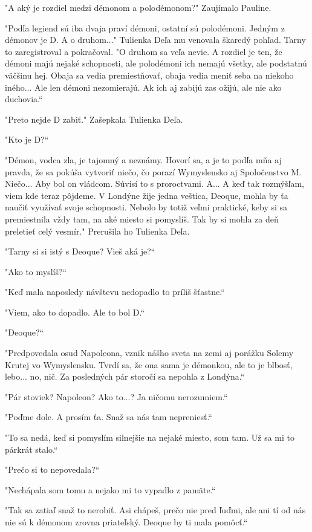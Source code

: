\documentclass{book}
\begin{document}
"$ $A aký je rozdiel medzi démonom a polodémonom?"$ $ Zaujímalo Pauline.

"Podľa legiend sú iba dvaja praví démoni, ostatní sú polodémoni. Jedným z démonov je D. A o druhom..."$ $ Tulienka Deľa mu venovala škaredý pohľad. Tarny to zaregistroval a pokračoval. "$ $O druhom sa veľa nevie. A rozdiel je ten, že démoni majú nejaké schopnosti, ale polodémoni ich nemajú všetky, ale podstatnú väčšinu hej. Obaja sa vedia premiestňovať, obaja vedia meniť seba na niekoho iného... Ale len démoni nezomierajú. Ak ich aj zabijú zas ožijú, ale nie ako duchovia.“

"Preto nejde D zabiť."$ $ Zašepkala Tulienka Deľa.

"Kto je D?“

"Démon, vodca zla, je tajomný a neznámy. Hovorí sa, a je to podľa mňa aj pravda, že sa pokúša vytvoriť niečo, čo porazí Wymyslensko aj Spoločenstvo M. Niečo... Aby bol on vládcom. Súvisí to s proroctvami. A... A keď tak rozmýšľam, viem kde teraz pôjdeme. V Londýne žije jedna veštica, Deoque, mohla by ťa naučiť využívať svoje schopnosti. Nebolo by totiž veľmi praktické, keby si sa premiestnila vždy tam, na aké miesto si pomyslíš. Tak by si mohla za deň preletieť celý vesmír."$ $ Prerušila ho Tulienka Deľa.

"Tarny si si istý s Deoque? Vieš aká je?“

"$ $Ako to myslíš?“

"Keď mala naposledy návštevu nedopadlo to príliš šťastne.“

"Viem, ako to dopadlo. Ale to bol D.“

"Deoque?“

"Predpovedala osud Napoleona, vznik nášho sveta na zemi aj porážku Solemy Krutej vo Wymyslensku. Tvrdí sa, že ona sama je démonkou, ale to je blbosť, lebo... no, nič. Za posledných pár storočí sa nepohla z Londýna.“

"Pár stoviek? Napoleon? Ako to...? Ja ničomu nerozumiem.“

"Poďme dole. A prosím ťa. Snaž sa nás tam nepreniesť.“

"To sa nedá, keď si pomyslím silnejšie na nejaké miesto, som tam. Už sa mi to párkrát stalo.“

"Prečo si to nepovedala?“

"Nechápala som tomu a nejako mi to vypadlo z pamäte.“

"Tak sa zatiaľ snaž to nerobiť. Asi chápeš, prečo nie pred ľuďmi, ale ani tí od nás nie sú k démonom zrovna priateľský. Deoque by ti mala pomôcť.“
\end{document}
